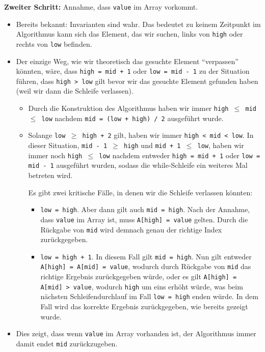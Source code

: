 \documentclass[10pt,a4paper,oneside,ngerman,numbers=noenddot]{scrartcl}
\begin{document}
		\textbf{Zweiter Schritt:} Annahme, dass \texttt{value} im Array vorkommt.
		\begin{itemize}
			\item	Bereits bekannt: Invarianten sind wahr. Das bedeutet zu keinem Zeitpunkt im Algorithmus kann sich das Element, das wir suchen, links von \texttt{high} oder rechts von \texttt{low} befinden.
			\item	Der einzige Weg, wie wir theoretisch das gesuchte Element "`verpassen"' könnten, wäre, dass \texttt{high = mid + 1} oder \texttt{low = mid - 1} zu der Situation führen, dass \texttt{high > low} gilt bevor wir das gesuchte Element gefunden haben (weil wir dann die Schleife verlassen).
			\begin{itemize}
				\item	Durch die Konstruktion des Algorithmus haben wir immer \texttt{high $\leq$ mid $\leq$ low} nachdem \texttt{mid = (low + high) / 2} ausgeführt wurde.
				\item	Solange \texttt{low $\geq$ high + 2} gilt, haben wir immer \texttt{high < mid < low}.
				In dieser Situation, \texttt{mid - 1 $\geq$ high} und \texttt{mid + 1 $\leq$ low}, haben wir immer noch \texttt{high $\leq$ low} nachdem entweder \texttt{high = mid + 1} oder \texttt{low = mid - 1} ausgeführt wurden, sodass die while-Schleife ein weiteres Mal betreten wird.

				Es gibt zwei kritische Fälle, in denen wir die Schleife verlassen könnten:
				\begin{itemize}
					\item	\texttt{low = high}. Aber dann gilt auch \texttt{mid = high}. Nach der Annahme, dass \texttt{value} im Array ist, muss \texttt{A[high] = value} gelten. Durch die Rückgabe von \texttt{mid} wird demnach genau der richtige Index zurückgegeben.
					\item	\texttt{low = high + 1}. In diesem Fall gilt \texttt{mid = high}. Nun gilt entweder \texttt{A[high] = A[mid] = value}, wodurch durch Rückgabe von \texttt{mid} das richtige Ergebnis zurückgegeben würde, oder es gilt \texttt{A[high] = A[mid] > value}, wodurch \texttt{high} um eins erhöht würde, was beim nächsten Schleifendurchlauf im Fall \texttt{low = high} enden würde. In dem Fall wird das korrekte Ergebnis zurückgegeben, wie bereits gezeigt wurde.
				\end{itemize}
			\end{itemize}
			\item	Dies zeigt, dass wenn \texttt{value} im Array vorhanden ist, der Algorithmus immer damit endet \texttt{mid} zurückzugeben.
		\end{itemize}
\end{document}
